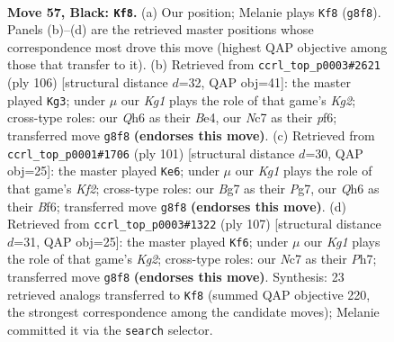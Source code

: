 \documentclass[11pt]{article}
\begin{document}
\clearpage

\begin{figure}[p]\centering
\begin{subfigure}{0.46\textwidth}\centering
\resizebox{\linewidth}{!}{%
\newchessgame
\chessboard[
  setfen={6k1/2n2pb1/7q/3P4/8/8/5KR1/8 b - - 1 57},
  showmover=false,
  pgfstyle=straightmove, color=movearrow, markmove={g8-f8}
]}
\caption{}
\end{subfigure}\hfill
\begin{subfigure}{0.46\textwidth}\centering
\resizebox{\linewidth}{!}{%
\newchessgame
\chessboard[
  setfen={8/6k1/5p2/7p/4B2P/8/r4BK1/8 w - - 19 54},
  showmover=false,
  pgfstyle=straightmove, color=movearrow, markmove={g2-g3}
]}
\caption{}
\end{subfigure}
\\[4pt]
\begin{subfigure}{0.46\textwidth}\centering
\resizebox{\linewidth}{!}{%
\newchessgame
\chessboard[
  setfen={8/5kp1/3P1b2/8/4K1R1/8/6p1/8 b - - 1 51},
  showmover=false,
  pgfstyle=straightmove, color=movearrow, markmove={f7-e6}
]}
\caption{}
\end{subfigure}\hfill
\begin{subfigure}{0.46\textwidth}\centering
\resizebox{\linewidth}{!}{%
\newchessgame
\chessboard[
  setfen={8/2R2bkp/8/8/7P/8/1p6/1K6 b - - 1 54},
  showmover=false,
  pgfstyle=straightmove, color=movearrow, markmove={g7-f6}
]}
\caption{}
\end{subfigure}
\caption{\textbf{Move 57, Black: \texttt{Kf8}.} (a) Our position; Melanie plays \texttt{Kf8} (\texttt{g8f8}). Panels (b)--(d) are the retrieved master positions whose correspondence most drove this move (highest QAP objective among those that transfer to it). (b) Retrieved from \texttt{ccrl\_top\_p0003\#2621} (ply 106) [structural distance $d$=32, QAP obj=41]: the master played \texttt{Kg3}; under $\mu$ our \emph{Kg1} plays the role of that game's \emph{Kg2}; cross-type roles: our \emph{Q}h6 as their \emph{B}e4, our \emph{N}c7 as their \emph{p}f6; transferred move \texttt{g8f8} \textbf{(endorses this move)}. (c) Retrieved from \texttt{ccrl\_top\_p0001\#1706} (ply 101) [structural distance $d$=30, QAP obj=25]: the master played \texttt{Ke6}; under $\mu$ our \emph{Kg1} plays the role of that game's \emph{Kf2}; cross-type roles: our \emph{B}g7 as their \emph{P}g7, our \emph{Q}h6 as their \emph{B}f6; transferred move \texttt{g8f8} \textbf{(endorses this move)}. (d) Retrieved from \texttt{ccrl\_top\_p0003\#1322} (ply 107) [structural distance $d$=31, QAP obj=25]: the master played \texttt{Kf6}; under $\mu$ our \emph{Kg1} plays the role of that game's \emph{Kg2}; cross-type roles: our \emph{N}c7 as their \emph{P}h7; transferred move \texttt{g8f8} \textbf{(endorses this move)}. Synthesis: 23 retrieved analogs transferred to \texttt{Kf8} (summed QAP objective 220, the strongest correspondence among the candidate moves); Melanie committed it via the \texttt{search} selector.}
\label{fig:thought-m113}
\end{figure}
\end{document}
